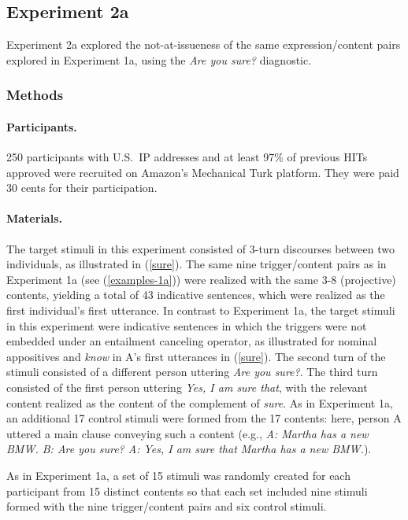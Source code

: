 \documentclass[11pt,fleqn]{article}
\newcommand{\6}{\mbox{$[\hspace*{-.6mm}[$}}
\newcommand{\9}{\mbox{$]\hspace*{-.6mm}]$}}
\begin{document}
\subsection{Experiment 2a}

Experiment 2a explored the not-at-issueness of the same expression/content pairs explored in Experiment 1a, using the {\em Are you sure?} diagnostic.

\subsubsection{Methods}\label{s-methods-2a}

\paragraph{Participants.} 250 participants with U.S.\ IP addresses and at least 97\% of previous HITs approved were recruited on Amazon's Mechanical Turk platform. They were paid 30 cents for their participation.

\paragraph{Materials.} The target stimuli in this experiment consisted of 3-turn discourses between two individuals, as illustrated in (\ref{sure}). The same nine trigger/content pairs as in Experiment 1a (see (\ref{examples-1a})) were realized with the same 3-8 (projective) contents, yielding a total of 43 indicative sentences, which were realized as the first individual's first utterance. In contrast to Experiment 1a, the target stimuli in this experiment were indicative sentences in which the triggers were not embedded under an entailment canceling operator, as illustrated for nominal appositives and {\em know} in A's first utterances in (\ref{sure}). The second turn of the stimuli consisted of a different person uttering {\em Are you sure?}. The third turn consisted of the first person uttering {\em Yes, I am sure that}, with the relevant content realized as the content of the complement of {\em sure}. As in Experiment 1a, an additional 17 control stimuli were formed from the 17 contents: here, person A uttered a main clause conveying such a content (e.g., {\em A: Martha has a new BMW. B: Are you sure? A: Yes, I am sure that Martha has a new BMW.}).

As in Experiment 1a, a set of 15 stimuli was randomly created for each participant from 15 distinct contents so that each set included nine stimuli formed with the nine trigger/content pairs and six control stimuli.
\end{document}
